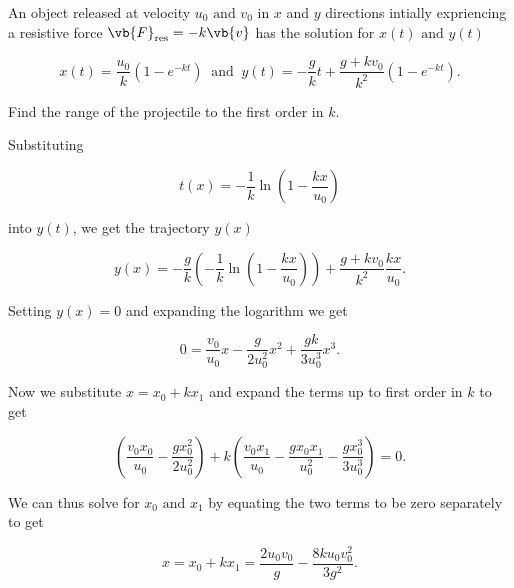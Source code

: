 \documentclass[a4paper,12pt]{report}
\begin{document}
{An object released at velocity \(u_0 \text { and } v_0 \) in \(x\) and \(y\) directions intially expriencing a resistive force \(\vb{F} _{\text{res} } = - k \vb{v}  \) has the solution for \(x(t) \text { and } y(t)\)

\begin{equation}
  x(t) = \frac{u_0 }{k} (1-e^{-kt} ) ~\text { and }~ y(t) = -\frac{g}{k} t + \frac{g+kv_0 }{k^2} (1-e^{-kt} ). 
\end{equation}

Find the range of the projectile to the first order in \(k\).

}
{Substituting 

\begin{equation}
  t(x) = -\frac{1}{k} \ln \left( 1- \frac{kx}{u_0 }  \right)
\end{equation}

into \(y(t)\), we get the trajectory \(y(x)\)

\begin{equation}
  y(x) = -\frac{g}{k} \left( -\frac{1}{k} \ln \left( 1- \frac{kx}{u_0 }  \right) \right) + \frac{g+kv_0 }{k^2} \frac{kx}{u_0 }.  
\end{equation}

Setting \(y(x) = 0\) and expanding the logarithm we get 

\begin{equation}
  0 = \frac{v_0 }{u_0 } x - \frac{g}{2u_0 ^2}x^2 + \frac{gk}{3 u_0 ^3 }x^3 .   
\end{equation}

Now we substitute \(x = x_0 + kx_1 \) and expand the terms up to first order in \(k\) to get  

\begin{equation}
  \left( \frac{v_0 x_0 }{u_0 } - \frac{gx_0 ^2}{2u_0 ^2}   \right) + k \left( \frac{v_0 x_1 }{u_0 } - \frac{gx_0 x_1 }{u_0 ^2} - \frac{gx_0 ^3 }{3 u_0 ^3 }   \right) = 0.
\end{equation}

We can thus solve for \(x_0  \text { and } x_1 \) by equating the two terms to be zero separately to get 

\begin{equation}
  x = x_0 + kx_1 = \frac{2u_0 v_0 }{g} - \frac{8 ku_0 v_0 ^2}{3g^2}.  
\end{equation}
~
} 
\end{document}
